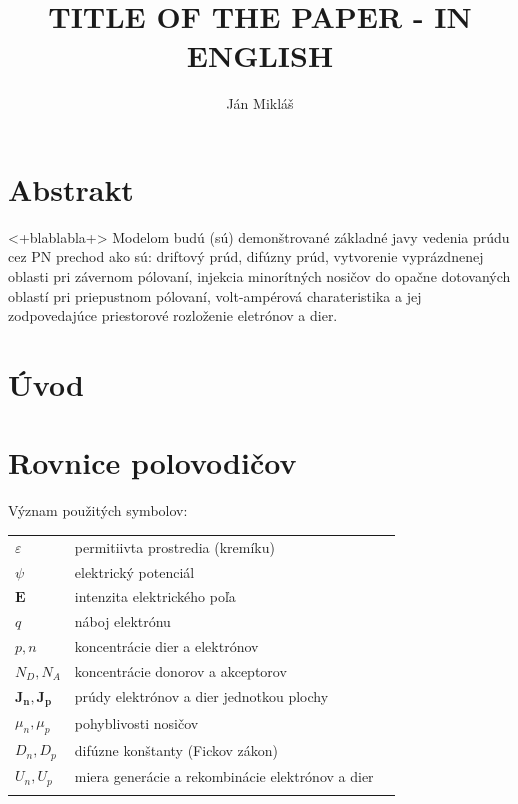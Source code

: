 \documentclass{eeict}
\title{TITLE OF THE PAPER - IN ENGLISH}
\author{Ján Mikláš}
\begin{document}

\maketitle

\section*{Abstrakt}
<+blablabla+>
Modelom budú (sú) demonštrované základné javy vedenia prúdu cez PN prechod ako sú: driftový prúd, difúzny prúd, vytvorenie vyprázdnenej oblasti pri závernom pólovaní, injekcia minorítných nosičov do opačne dotovaných oblastí pri priepustnom pólovaní, volt-ampérová charateristika a jej zodpovedajúce priestorové rozloženie eletrónov a dier.

\section{Úvod}


\section{Rovnice polovodičov}
Význam použitých symbolov:\\
\begin{tabular}{l l l}
	\hline
	$\varepsilon$ & permitiivta prostredia (kremíku)\\
	$\psi$ & elektrický potenciál \\
	$\mathbf{E}$ & intenzita elektrického poľa\\
	$q$ & náboj elektrónu\\
	$p, n$ & koncentrácie dier a elektrónov\\
	$N_D, N_A$ & koncentrácie donorov a akceptorov\footnotemark\\
	$\mathbf{J_n}, \mathbf{J_p}$ & prúdy elektrónov a dier jednotkou plochy\\
	$\mu_n, \mu_p$ & pohyblivosti nosičov\\
	$D_n, D_p$ & difúzne konštanty (Fickov zákon)\\
	$U_n, U_p$ & miera generácie a rekombinácie elektrónov a dier\\
	\hline \\
\end{tabular}
\end{document}
